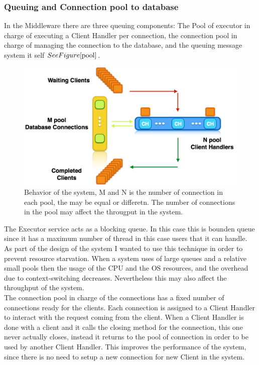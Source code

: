 \subsubsection{Queuing and Connection pool to database}\label{sec:queuing-and-connection-pool-to-database}
In the Middleware there are three queuing components: The Pool of executor in charge of executing a Client Handler per connection, the connection pool in charge of managing the connection to the database, and the queuing message system it self \( See Figure \ref{pool} \).\\

\begin{figure}[h!]
	\centering
	\includegraphics[scale=0.3]{connpool.png}
	\caption{Behavior of the system, M and N is the number of connection in each pool, the may be equal or differetn. The number of connections in the pool may affect the througput in the system.}
	\label{pool}
\end{figure}

The Executor service acts as a blocking queue. In this case this is bounden queue since it has a maximum number of thread in this case users that it can handle. As part of the design of the system I wanted to use this technique in order to prevent resource starvation. When a system uses of large queues and a relative small pools then the usage of the CPU and the OS resources, and the overhead due to context-switching decreases. Nevertheless this may also affect the throughput of the system.\\

The connection pool in charge of the connections has a fixed number of connections ready for the clients. Each connection is assigned to a Client Handler to interact with the request coming from the client. When a Client Handler is done with a client and it calls the closing method for the connection, this one never actually closes, instead it returns to the pool of connection in order to be used by another Client Handler. This improves the performance of the system, since there is no need to setup a new connection for new Client in the system.


